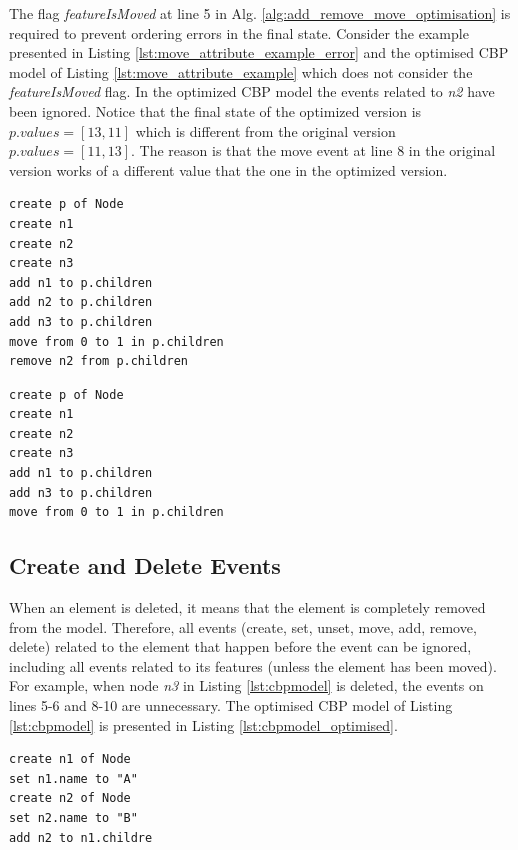 \documentclass{llncs}
\begin{document}
The flag \emph{featureIsMoved} at line 5 in Alg. \ref{alg:add_remove_move_optimisation} is required to prevent ordering errors in the final state.
Consider the example presented in Listing \ref{lst:move_attribute_example_error} and the optimised CBP model of Listing \ref{lst:move_attribute_example} which does not consider the \emph{featureIsMoved} flag.
In the optimized CBP model the events related to \emph{n2} have been ignored.
Notice that the final state of the optimized version is $p.values = [13, 11]$  which is different from the original version $p.values = [11,13]$.
The reason is that the move event at line 8 in the original version works of a different value that the one in the optimized version.

\begin{lstlisting}[style=eol,caption={The CBP representation of attribute \emph{values}'s move event.},label=lst:move_attribute_example]
create p of Node
create n1
create n2
create n3
add n1 to p.children
add n2 to p.children
add n3 to p.children
move from 0 to 1 in p.children
remove n2 from p.children
\end{lstlisting}

\begin{lstlisting}[style=eol,caption={The optimised CBP representation of attribute \emph{values}'s event.},label=lst:move_attribute_example_error]
create p of Node
create n1
create n2
create n3
add n1 to p.children
add n3 to p.children
move from 0 to 1 in p.children
\end{lstlisting}

\subsection{Create and Delete Events}
\label{subsec:create_and_delete_operations}
When an element is deleted, it means that the element is completely removed from the model.
Therefore, all events (create, set, unset, move, add, remove, delete) related to the element that happen before the event can be ignored, including all events related to its features (unless the element has been moved).
For example, when node \emph{n3} in Listing \ref{lst:cbpmodel}  is deleted, the events on lines 5-6 and 8-10 are unnecessary.
The optimised CBP model of Listing \ref{lst:cbpmodel} is presented in Listing \ref{lst:cbpmodel_optimised}.

\begin{lstlisting}[style=eol,caption={Change-based representation of the model of Figure \ref{fig:initial_model} after removal of node \emph{n5}.},label=lst:cbpmodel_optimised]
create n1 of Node
set n1.name to "A"
create n2 of Node
set n2.name to "B"
add n2 to n1.childre
\end{lstlisting}
\end{document}
